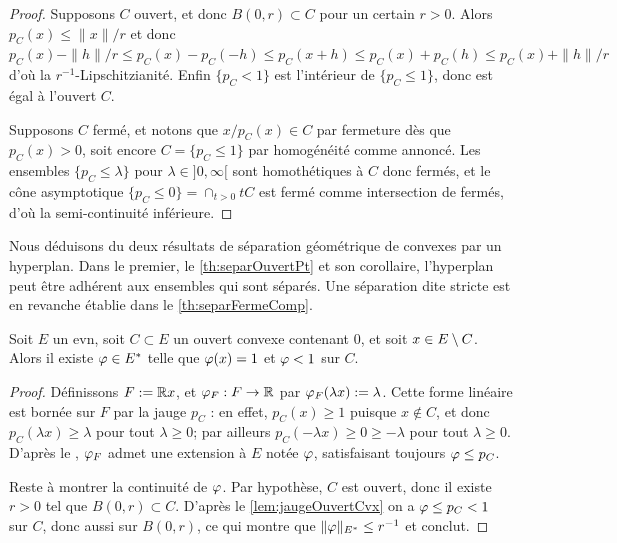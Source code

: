 \begin{proof}
	Supposons $C$ ouvert, et donc $B(0,r) \subset C$ pour un certain $r>0$. Alors $p_C(x) \leq \|x\|/r$ et donc $p_C(x) - \|h\|/r \leq p_C(x) - p_C(-h) \leq p_C(x+h) \leq p_C(x) + p_C(h) \leq p_C(x) + \|h\|/r$ d'où la $r^{-1}$-Lipschitzianité. Enfin $\{p_C < 1\}$ est l'intérieur de $\{p_C\leq 1\}$, donc est égal à l'ouvert $C$. 
	
	Supposons $C$ fermé, et notons que $x/p_C(x) \in C$ par fermeture dès que $p_C(x) >0$, soit encore $C = \{p_C \leq 1\}$ par homogénéité comme annoncé. 
	Les ensembles $\{p_C \leq \lambda\}$ pour $\lambda \in ]0,\infty[$ sont homothétiques à $C$ donc fermés, et le cône asymptotique $\{p_C \leq 0\} = \cap_{t>0} t C$ est fermé comme intersection de fermés, d'où la semi-continuité inférieure. 
\end{proof}

Nous déduisons du  deux résultats de séparation géométrique de convexes par un hyperplan. Dans le premier, le \cref{th:separOuvertPt} et son corollaire, l'hyperplan peut être adhérent aux ensembles qui sont séparés. Une séparation dite stricte est en revanche établie dans le \cref{th:separFermeComp}.

\begin{theorem}
\label{th:separOuvertPt}
%
	Soit $E$ un evn, soit $C \subset E$ un ouvert convexe contenant $0$, et soit $x \in E\setminus C$. Alors il existe $\varphi \in E^*$ telle que $\varphi(x)=1$ et $\varphi<1$ sur $C$. 
	\end{theorem}

\begin{proof}
Définissons $F := \mathbb{R} x$, et $\varphi_F : F \to \mathbb{R}$ par $\varphi_F(\lambda x) := \lambda$.
Cette forme linéaire est bornée sur $F$ par la jauge $p_C$ :  en effet, $p_C(x) \geq 1$ puisque $x \notin C$, et donc $p_C(\lambda x) \geq \lambda$ pour tout $\lambda \geq 0$; par ailleurs $p_C(-\lambda x) \geq 0 \geq -\lambda$ pour tout $\lambda \geq 0$. 
	D'après le , $\varphi_F$ admet une extension à $E$ notée $\varphi$, satisfaisant toujours $\varphi \leq p_C$. 
	
	Reste à montrer la continuité de $\varphi$. 
	Par hypothèse, $C$ est ouvert, donc il existe $r>0$ tel que $B(0,r) \subset C$.
	D'après le \cref{lem:jaugeOuvertCvx} on a $\varphi \leq p_C < 1$ sur $C$, donc aussi sur $B(0,r)$, ce qui montre que $\|\varphi\|_{E^*} \leq r^{-1}$ et conclut. 
\end{proof}

